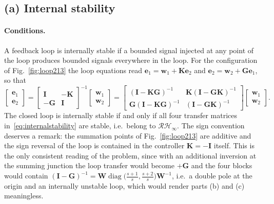 \subsection{(a) Internal stability}

\paragraph{Conditions.} A feedback loop is internally stable if a bounded signal injected at any
point of the loop produces bounded signals everywhere in the loop. For the configuration of
Fig.~\ref{fig:loop213} the loop equations read
$\mathbf{e}_1=\mathbf{w}_1+\mathbf{K}\mathbf{e}_2$ and
$\mathbf{e}_2=\mathbf{w}_2+\mathbf{G}\mathbf{e}_1$, so that
\begin{equation}
    \begin{bmatrix}\mathbf{e}_1\\ \mathbf{e}_2\end{bmatrix}
    =
    \begin{bmatrix}\mathbf{I} & -\mathbf{K}\\ -\mathbf{G} & \mathbf{I}\end{bmatrix}^{-1}
    \begin{bmatrix}\mathbf{w}_1\\ \mathbf{w}_2\end{bmatrix}
    =
    \begin{bmatrix}
        (\mathbf{I}-\mathbf{K}\mathbf{G})^{-1} &
        \mathbf{K}(\mathbf{I}-\mathbf{G}\mathbf{K})^{-1}\\[4pt]
        \mathbf{G}(\mathbf{I}-\mathbf{K}\mathbf{G})^{-1} &
        (\mathbf{I}-\mathbf{G}\mathbf{K})^{-1}
    \end{bmatrix}
    \begin{bmatrix}\mathbf{w}_1\\ \mathbf{w}_2\end{bmatrix} .
    \label{eq:internalstability}
\end{equation}
The closed loop is internally stable if and only if all four transfer matrices
in~\eqref{eq:internalstability} are stable, i.e.\ belong to $\mathcal{RH}_\infty$. The sign
convention deserves a remark: the summation points of Fig.~\ref{fig:loop213} are additive and the
sign reversal of the loop is contained in the controller $\mathbf{K}=-\mathbf{I}$ itself. This is
the only consistent reading of the problem, since with an additional inversion at the summing
junction the loop transfer would become $+\mathbf{G}$ and the four blocks would contain
$(\mathbf{I}-\mathbf{G})^{-1}=\mathbf{W}\operatorname{diag}\!\big(\tfrac{s+1}{s},
\tfrac{s+2}{s}\big)\mathbf{W}^{-1}$, i.e.\ a double pole at the origin and an internally
unstable loop, which would render parts (b) and (c) meaningless.

